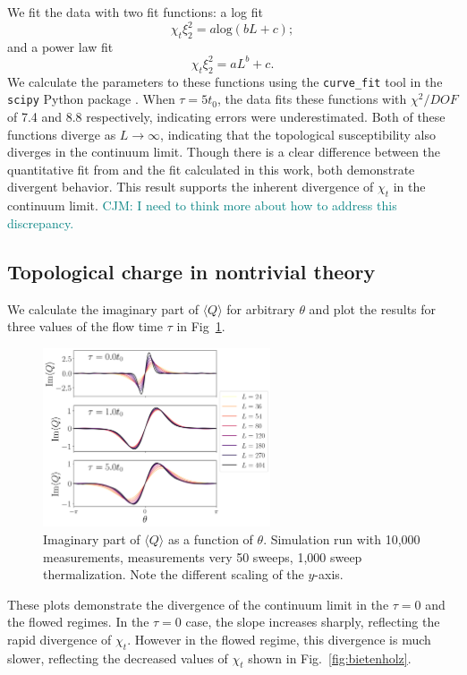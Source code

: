 \documentclass[a4paper,11pt]{article}
\newcommand{\logchi}{7.4 }
\newcommand{\powchi}{8.8 }
\newcommand\chris[1]{\textcolor{teal}{CJM: #1}}
\begin{document}
We fit the data with two fit functions: a log fit
\begin{equation}
    \chi_t \xi_2^2 = a \mathrm{log}(b L + c);
\end{equation}
and a power law fit
\begin{equation}
    \chi_t \xi_2^2 = a L^b + c.
\end{equation}
We calculate the parameters to these functions using the \texttt{curve\_fit} tool in the \texttt{scipy} Python package \cite{virtanen2020}. When $\tau=5t_0$, the data fits these functions with $\chi^2/DOF$ of \logchi and \powchi respectively, indicating errors were underestimated. Both of these functions diverge as $L\rightarrow \infty$, indicating that the topological susceptibility also diverges in the continuum limit. Though there is a clear difference between the quantitative fit from \cite{bietenholz2018} and the fit calculated in this work, both demonstrate divergent behavior. This result supports the inherent divergence of $\chi_t$ in the continuum limit. \chris{I need to think more about how to address this discrepancy.}


\subsection{Topological charge in nontrivial theory}

We calculate the imaginary part of $\langle Q \rangle$ for arbitrary $\theta$ and plot the results for three values of the flow time $\tau$ in Fig~\ref{fig:theta}.
\begin{figure}[h!]
    \centering
      \includegraphics[width=0.6\textwidth]{theta-small.png}
      \caption{\label{fig:theta} Imaginary part of $\langle Q \rangle$ as a function of $\theta$. Simulation run with 10,000 measurements, measurements very 50 sweeps, 1,000 sweep thermalization. Note the different scaling of the $y$-axis.}
\end{figure}
These plots demonstrate the divergence of the continuum limit in the $\tau=0$ and the flowed regimes. In the $\tau=0$ case, the slope increases sharply, reflecting the rapid divergence of $\chi_t$. However in the flowed regime, this divergence is much slower, reflecting the decreased values of $\chi_t$ shown in Fig.~\ref{fig:bietenholz}.
\end{document}
